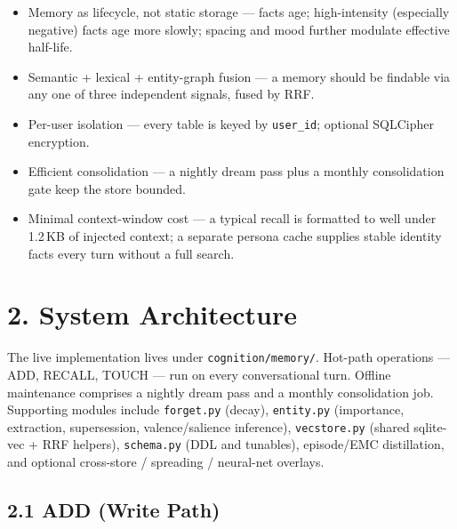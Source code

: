 \documentclass[]{article}
\begin{document}
\begin{itemize}
\item Memory as lifecycle, not static storage --- facts age; high-intensity
  (especially negative) facts age more slowly; spacing and mood further
  modulate effective half-life.
\item Semantic + lexical + entity-graph fusion --- a memory should be
  findable via any one of three independent signals, fused by RRF.
\item Per-user isolation --- every table is keyed by \texttt{user\_id};
  optional SQLCipher encryption.
\item Efficient consolidation --- a nightly dream pass plus a monthly
  consolidation gate keep the store bounded.
\item Minimal context-window cost --- a typical recall is formatted to well
  under 1.2\,KB of injected context; a separate persona cache supplies
  stable identity facts every turn without a full search.
\end{itemize}

\hypertarget{system-architecture}{%
\section{\texorpdfstring{\textbf{2. System
Architecture}}{2. System Architecture}}\label{system-architecture}}

The live implementation lives under \texttt{cognition/memory/}. Hot-path
operations --- ADD, RECALL, TOUCH --- run on every conversational turn.
Offline maintenance comprises a nightly dream pass and a monthly
consolidation job. Supporting modules include \texttt{forget.py}
(decay), \texttt{entity.py} (importance, extraction, supersession,
valence/salience inference), \texttt{vecstore.py} (shared sqlite-vec +
RRF helpers), \texttt{schema.py} (DDL and tunables), episode/EMC
distillation, and optional cross-store / spreading / neural-net overlays.

\hypertarget{add-write-path}{%
\subsection{\texorpdfstring{\textbf{2.1 ADD (Write
Path)}}{2.1 ADD (Write Path)}}\label{add-write-path}}
\end{document}
